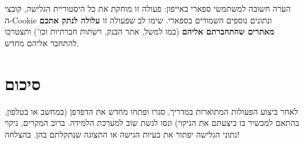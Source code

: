 \documentclass[12pt]{article}
\begin{document}
\begin{remarkBox}{הערה חשובה למשתמשי ספארי באייפון:}
פעולה זו מוחקת את כל היסטוריית הגלישה, קובצי ה-Cookie ונתונים נוספים השמורים בספארי. שימו לב שפעולה זו \textbf{עלולה לנתק אתכם מאתרים שהתחברתם אליהם} (כמו למשל, אתר הבנק, רשתות חברתיות וכו') ותצטרכו להתחבר אליהם מחדש.
\end{remarkBox}


\section*{סיכום}

לאחר ביצוע הפעולות המתוארות במדריך, סגרו ופתחו מחדש את הדפדפן (במחשב או בטלפון, בהתאם למכשיר בו ביצעתם את הניקוי) ונסו לגשת שוב למערכת הלמידה. ברוב המקרים, ניקוי נתוני הגלישה יפתור את בעיות הגישה או התצוגה שנתקלתם בהן. בהצלחה!
\end{document}
